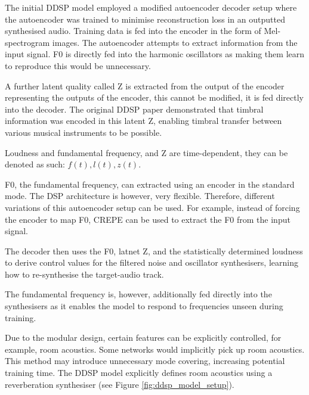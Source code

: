 The initial DDSP model\cite{OriginalDDSP} employed a modified autoencoder decoder setup where the autoencoder was trained to minimise reconstruction loss in an outputted synthesised audio. Training data is fed into the encoder in the form of Mel-spectrogram images. The autoencoder attempts to extract information from the input signal. F0 is directly fed into the harmonic oscillators as making them learn to reproduce this would be unnecessary.

A further latent quality called Z is extracted from the output of the encoder representing the outputs of the encoder, this cannot be modified, it is fed directly into the decoder. The original DDSP paper demonstrated that timbral information was encoded in this latent Z, enabling timbral transfer between various musical instruments to be possible.

Loudness and fundamental frequency, and Z are time-dependent, they can be denoted as such: $f(t), l(t), z(t)$.

F0, the fundamental frequency, can extracted using an encoder in the standard mode. The DSP architecture is however, very flexible. Therefore, different variations of this autoencoder setup can be used. For example, instead of forcing the encoder to map F0, CREPE can be used to extract the F0 from the input signal.

\vspace{0.5cm}
\vspace{0.5cm}

The decoder then uses the F0, latnet Z, and the statistically determined loudness to derive control values for the filtered noise and oscillator synthesisers, learning how to re-synthesise the target-audio track.

The fundamental frequency is, however, additionally fed directly into the synthesisers as it enables the model to respond to frequencies unseen during training\cite{SingingDDSP}.

Due to the modular design, certain features can be explicitly controlled, for example, room acoustics. Some networks would implicitly pick up room acoustics. This method may introduce unnecessary mode covering, increasing potential training time. The DDSP model explicitly defines room acoustics using a reverberation synthesiser (see Figure \ref{fig:ddsp_model_setup}).

